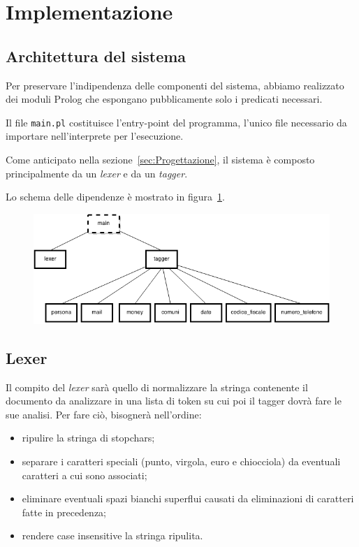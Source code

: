 \section{Implementazione}

\subsection{Architettura del sistema}
Per preservare l'indipendenza delle componenti del sistema, abbiamo realizzato dei moduli Prolog che espongano pubblicamente solo i predicati necessari.

Il file \verb+main.pl+ costituisce l'entry-point del programma, l'unico file necessario da importare nell'interprete per l'esecuzione.

Come anticipato nella sezione~\ref{sec:Progettazione}, il sistema è composto principalmente da un \emph{lexer} e da un \emph{tagger}.

Lo schema delle dipendenze è mostrato in figura~\ref{fig:moduli}.

\begin{figure}[h!tbp]
\includegraphics[width=\textwidth]{img/struttura_moduli.png}
\label{fig:moduli}
\end{figure}

\subsection{Lexer}
Il compito del \emph{lexer} sarà quello di normalizzare la stringa contenente il documento da analizzare in una lista di token su cui poi il tagger dovrà fare le sue analisi. Per fare ciò, bisognerà nell'ordine:
\begin{itemize}
    \item ripulire la stringa di stopchars;
    \item separare i caratteri speciali (punto, virgola, euro e chiocciola) da eventuali caratteri a cui sono associati;
    \item eliminare eventuali spazi bianchi superflui causati da eliminazioni di caratteri fatte in precedenza;
    \item rendere case insensitive la stringa ripulita.
\end{itemize}

